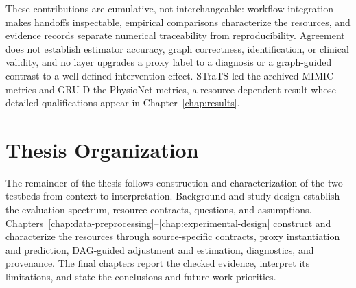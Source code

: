 These contributions are cumulative, not interchangeable: workflow integration makes handoffs inspectable, empirical comparisons characterize the resources, and evidence records separate numerical traceability from reproducibility.  Agreement does not establish estimator accuracy, graph correctness, identification, or clinical validity, and no layer upgrades a proxy label to a diagnosis or a graph-guided contrast to a well-defined intervention effect.  STraTS led the archived MIMIC metrics and GRU-D the PhysioNet metrics, a resource-dependent result whose detailed qualifications appear in Chapter~\ref{chap:results}.

\section{Thesis Organization}
\label{sec:introduction:thesis-organization}

The remainder of the thesis follows construction and characterization of the two testbeds from context to interpretation.  Background and study design establish the evaluation spectrum, resource contracts, questions, and assumptions.  Chapters~\ref{chap:data-preprocessing}--\ref{chap:experimental-design} construct and characterize the resources through source-specific contracts, proxy instantiation and prediction, DAG-guided adjustment and estimation, diagnostics, and provenance.  The final chapters report the checked evidence, interpret its limitations, and state the conclusions and future-work priorities.
